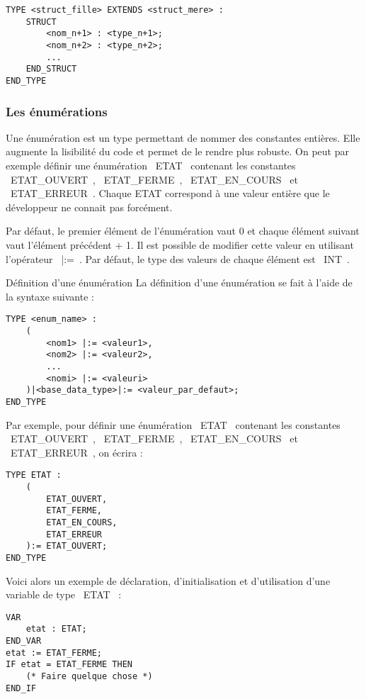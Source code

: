 \begin{lstlisting}[language=ST]
TYPE <struct_fille> EXTENDS <struct_mere> :
    STRUCT
        <nom_n+1> : <type_n+1>;
        <nom_n+2> : <type_n+2>;
        ...
    END_STRUCT
END_TYPE\end{lstlisting}

\subsubsection{Les énumérations}
Une énumération est un type permettant de nommer des constantes entières. Elle augmente la lisibilité du code et permet de le rendre plus robuste. On peut par exemple définir une énumération ~ETAT~ contenant les constantes ~ETAT\_OUVERT~, ~ETAT\_FERME~, ~ETAT\_EN\_COURS~ et ~ETAT\_ERREUR~. Chaque ETAT correspond à une valeur entière que le développeur ne connait pas forcément. 

Par défaut, le premier élément de l'énumération vaut 0 et chaque élément suivant vaut l'élément précédent + 1. Il est possible de modifier cette valeur en utilisant l'opérateur ~|:=~. Par défaut, le type des valeurs de chaque élément est ~INT~. 

\begin{UPSTIinfor}{Définition d'une énumération}
    La définition d'une énumération se fait à l'aide de la syntaxe suivante : 
    \begin{lstlisting}[language=ST]
TYPE <enum_name> :
    (
        <nom1> |:= <valeur1>,
        <nom2> |:= <valeur2>,
        ...
        <nomi> |:= <valeuri>
    )|<base_data_type>|:= <valeur_par_defaut>;
END_TYPE\end{lstlisting}
\end{UPSTIinfor}

Par exemple, pour définir une énumération ~ETAT~ contenant les constantes ~ETAT\_OUVERT~, ~ETAT\_FERME~, ~ETAT\_EN\_COURS~ et ~ETAT\_ERREUR~, on écrira :
\begin{lstlisting}[language=ST]
TYPE ETAT :
    (
        ETAT_OUVERT,
        ETAT_FERME,
        ETAT_EN_COURS,
        ETAT_ERREUR
    ):= ETAT_OUVERT;
END_TYPE\end{lstlisting}

Voici alors un exemple de déclaration, d'initialisation et d'utilisation d'une variable de type ~ETAT~ :
\begin{lstlisting}[language=ST]
VAR
    etat : ETAT;
END_VAR
etat := ETAT_FERME;
IF etat = ETAT_FERME THEN
    (* Faire quelque chose *)
END_IF\end{lstlisting}

